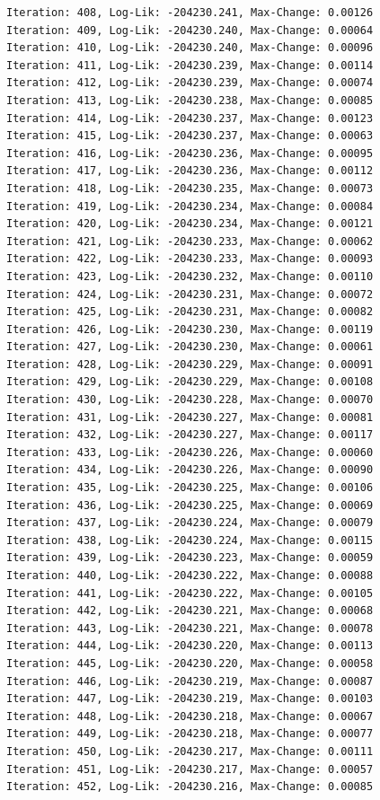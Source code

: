 \documentclass[
  letterpaper,
  DIV=11,
  numbers=noendperiod]{scrreport}
\begin{document}
\begin{verbatim}
Iteration: 408, Log-Lik: -204230.241, Max-Change: 0.00126
Iteration: 409, Log-Lik: -204230.240, Max-Change: 0.00064
Iteration: 410, Log-Lik: -204230.240, Max-Change: 0.00096
Iteration: 411, Log-Lik: -204230.239, Max-Change: 0.00114
Iteration: 412, Log-Lik: -204230.239, Max-Change: 0.00074
Iteration: 413, Log-Lik: -204230.238, Max-Change: 0.00085
Iteration: 414, Log-Lik: -204230.237, Max-Change: 0.00123
Iteration: 415, Log-Lik: -204230.237, Max-Change: 0.00063
Iteration: 416, Log-Lik: -204230.236, Max-Change: 0.00095
Iteration: 417, Log-Lik: -204230.236, Max-Change: 0.00112
Iteration: 418, Log-Lik: -204230.235, Max-Change: 0.00073
Iteration: 419, Log-Lik: -204230.234, Max-Change: 0.00084
Iteration: 420, Log-Lik: -204230.234, Max-Change: 0.00121
Iteration: 421, Log-Lik: -204230.233, Max-Change: 0.00062
Iteration: 422, Log-Lik: -204230.233, Max-Change: 0.00093
Iteration: 423, Log-Lik: -204230.232, Max-Change: 0.00110
Iteration: 424, Log-Lik: -204230.231, Max-Change: 0.00072
Iteration: 425, Log-Lik: -204230.231, Max-Change: 0.00082
Iteration: 426, Log-Lik: -204230.230, Max-Change: 0.00119
Iteration: 427, Log-Lik: -204230.230, Max-Change: 0.00061
Iteration: 428, Log-Lik: -204230.229, Max-Change: 0.00091
Iteration: 429, Log-Lik: -204230.229, Max-Change: 0.00108
Iteration: 430, Log-Lik: -204230.228, Max-Change: 0.00070
Iteration: 431, Log-Lik: -204230.227, Max-Change: 0.00081
Iteration: 432, Log-Lik: -204230.227, Max-Change: 0.00117
Iteration: 433, Log-Lik: -204230.226, Max-Change: 0.00060
Iteration: 434, Log-Lik: -204230.226, Max-Change: 0.00090
Iteration: 435, Log-Lik: -204230.225, Max-Change: 0.00106
Iteration: 436, Log-Lik: -204230.225, Max-Change: 0.00069
Iteration: 437, Log-Lik: -204230.224, Max-Change: 0.00079
Iteration: 438, Log-Lik: -204230.224, Max-Change: 0.00115
Iteration: 439, Log-Lik: -204230.223, Max-Change: 0.00059
Iteration: 440, Log-Lik: -204230.222, Max-Change: 0.00088
Iteration: 441, Log-Lik: -204230.222, Max-Change: 0.00105
Iteration: 442, Log-Lik: -204230.221, Max-Change: 0.00068
Iteration: 443, Log-Lik: -204230.221, Max-Change: 0.00078
Iteration: 444, Log-Lik: -204230.220, Max-Change: 0.00113
Iteration: 445, Log-Lik: -204230.220, Max-Change: 0.00058
Iteration: 446, Log-Lik: -204230.219, Max-Change: 0.00087
Iteration: 447, Log-Lik: -204230.219, Max-Change: 0.00103
Iteration: 448, Log-Lik: -204230.218, Max-Change: 0.00067
Iteration: 449, Log-Lik: -204230.218, Max-Change: 0.00077
Iteration: 450, Log-Lik: -204230.217, Max-Change: 0.00111
Iteration: 451, Log-Lik: -204230.217, Max-Change: 0.00057
Iteration: 452, Log-Lik: -204230.216, Max-Change: 0.00085

\end{verbatim}
\end{document}
